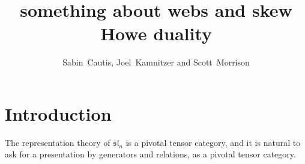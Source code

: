 \documentclass[10pt,leqno]{article}
\title{something about webs and skew Howe duality}
\author{Sabin~Cautis, Joel~Kamnitzer and Scott~Morrison}
\begin{document}
\makeatletter
{}
\gdef\theequation{\thesection.\arabic{equation}}
\makeatother

\maketitle

\begin{abstract}
\end{abstract}


\tableofcontents


\newcommand{\alt}{\wedge}

\newcommand{\Alt}{\bigwedge}

\newcommand{\Usl}[1]{U\sl_{#1}}

\newcommand{\one}{1}

\def\bZ{{\mathbb{Z}}}
\def\sl{{\mathfrak{sl}}}
\def\Sp{{\mathcal{S}p}}
\def\FSp{{\mathcal{FS}p}}
\def\bC{{\mathbb{C}}}
\def\g{{\mathfrak{g}}}
\def\SL{{\rm{SL}}}
\def\GL{{\rm{GL}}}
\def\gl{{\mathfrak{gl}}}
\def\dU{\dot{{\mathcal{U}}}}
\def\Rep{\mathcal{R}ep}
\def\la{\langle}
\def\ra{\rangle}

\newcommand{\ul}[1]{{\underline{#1}}}

\newcommand{\Lad}{\mathcal{L}ad}

\section{Introduction}
The representation theory of $\sl_n$ is a pivotal tensor category, and it is natural to ask for a presentation by generators and relations, as a pivotal tensor category.
\end{document}
